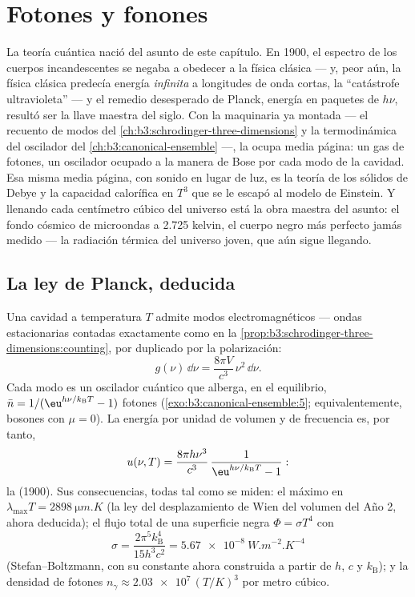 \chapter{Fotones y fonones}\label{ch:b3:photons-phonons}

La teoría cuántica nació del asunto de este capítulo. En 1900, el
espectro de los cuerpos incandescentes se negaba a obedecer a la física
clásica --- y, peor aún, la física clásica predecía energía \emph{infinita} a
longitudes de onda cortas, la ``catástrofe ultravioleta'' --- y el remedio
desesperado de Planck, energía en paquetes de $h\nu$, resultó ser la
llave maestra del siglo. Con la maquinaria ya montada --- el recuento de
modos del \cref{ch:b3:schrodinger-three-dimensions} y la termodinámica del
oscilador del \cref{ch:b3:canonical-ensemble} ---, la 
ocupa media página: un gas de fotones, un oscilador ocupado a la manera de
Bose por cada modo de la cavidad. Esa misma media página, con sonido en lugar de luz,
es la teoría de los sólidos de Debye y la capacidad calorífica en $T^3$ que se
le escapó al modelo de Einstein. Y llenando cada centímetro cúbico del universo está
la obra maestra del asunto: el fondo cósmico de microondas a 2.725 kelvin,
el cuerpo negro más perfecto jamás medido --- la
radiación térmica del universo joven, que aún sigue llegando.

\section{La ley de Planck, deducida}

\begin{theorem}\label{thm:b3:photons-phonons:planck}
Una cavidad a temperatura $T$ admite modos electromagnéticos ---
ondas estacionarias contadas exactamente como en la
\cref{prop:b3:schrodinger-three-dimensions:counting}, por duplicado por la
polarización:
\[
g(\nu)\,\dd\nu = \frac{8\pi V}{c^3}\,\nu^2\,\dd\nu .
\]
Cada modo es un oscilador cuántico que alberga, en el equilibrio,
$\bar n = 1/(\eu^{h\nu/k_{\text{B}}T} - 1)$ fotones
(\cref{exo:b3:canonical-ensemble:5}; equivalentemente, bosones con $\mu =
0$). La energía por unidad de volumen y de frecuencia es, por tanto,
\[
u(\nu, T) = \frac{8\pi h\nu^3}{c^3}\,
\frac{1}{\eu^{h\nu/k_{\text{B}}T} - 1} :
\]
la \emph{} (1900). Sus consecuencias, todas tal como se miden:
el máximo en $\lambda_{\max}T = \qty{2898}{\micro m.K}$ (la ley del
desplazamiento de Wien del volumen del Año 2, ahora deducida); el flujo total
de una superficie negra $\Phi = \sigma T^4$ con
\[
\sigma = \frac{2\pi^5k_{\text{B}}^4}{15h^3c^2}
 = \qty{5.67e-8}{W.m^{-2}.K^{-4}}
\]
(Stefan--Boltzmann, con su constante ahora construida a partir de $h$, $c$ y
$k_{\text{B}}$); y la densidad de fotones $n_\gamma \approx
\num{2.03e7}\,(T/\unit{K})^3$ por metro cúbico.
\end{theorem}

